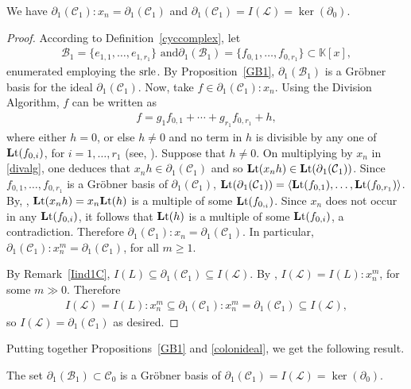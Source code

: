\documentclass[ALCO]{cedram}
\newcommand{\mbk}{\mbox{$\mathbb{K}$}}
\newcommand{\lt}{\mbox{${\bf L}{\rm t}$}}
\newcommand{\mcb}{\mbox{$\mathcal{B}$}}
\newcommand{\mcc}{\mbox{$\mathcal{C}$}}
\newcommand{\mcl}{\mbox{$\mathcal{L}$}}
\newcommand{\dif}{\mbox{$\partial$}}
\newcommand{\srle}{\mbox{${\rm srle}$}}
\begin{document}
\begin{proposition}\label{colonideal}
We have $\dif_1(\mcc_1):x_n=\dif_1(\mcc_1)$ and
$\dif_1(\mcc_1)=I(\mcl)=\ker(\dif_0)$.
\end{proposition}
\begin{proof}
According to Definition~\ref{cyccomplex}, let 
\begin{eqnarray*}
\mcb_1=\{e_{1,1},\ldots ,e_{1,r_1}\}\mbox{ and
}\dif_1(\mcb_1)=\{f_{0,1},\ldots ,f_{0,r_1}\}\subset \mbk[x],
\end{eqnarray*}
enumerated employing the $\srle$.  By
Proposition~\ref{GB1}, $\dif_1(\mcb_1)$ is a Gr\"obner basis for the
ideal $\dif_1(\mcc_1)$. Now, take $f\in \dif_1(\mcc_1):x_n$. Using the
Division Algorithm, $f$ can be written as
\begin{eqnarray}\label{divalg}
f=g_1f_{0,1}+\cdots +g_{r_1}f_{0,r_1}+h, 
\end{eqnarray}
where either $h=0$, or else $h\neq 0$ and no term in $h$ is divisible
by any one of $\lt(f_{0,i})$, for $i=1,\ldots ,r_1$ (see, \eg
\cite[\S~2.3, Theorem~3]{clo}). Suppose that $h\neq 0$. On multiplying
by $x_n$ in \eqref{divalg}, one deduces that $x_nh\in \dif_1(\mcc_1)$
and so $\lt(x_nh)\in \lt(\dif_1(\mcc_1))$. Since $f_{0,1},\ldots
,f_{0,r_1}$ is a Gr\"obner basis of $\dif_1(\mcc_1)$,
$\lt(\dif_1(\mcc_1))=\langle \lt(f_{0,1}),\ldots
,\lt(f_{0,r_1})\rangle$. By, \eg \cite[\S~2.4, Lemma~2]{clo},
$\lt(x_nh)=x_n\lt(h)$ is a multiple of some $\lt(f_{0,_i})$.  Since
$x_n$ does not occur in any $\lt(f_{0,i})$, it follows that $\lt(h)$
is a multiple of some $\lt(f_{0,i})$, a contradiction. Therefore
$\dif_1(\mcc_1):x_n=\dif_1(\mcc_1)$. In particular,
$\dif_1(\mcc_1):x_n^{m}=\dif_1(\mcc_1)$, for all $m\geq 1$.

By Remark~\ref{Iind1C}, $I(L)\subseteq \dif_1(\mcc_1)\subseteq
I(\mcl)$.  By \cite[Proposition~5.7]{opv}, $I(\mcl)=I(L):x_n^m$, for
some $m\gg 0$. Therefore
\begin{eqnarray*}
I(\mcl)=I(L):x_n^m\subseteq
\dif_1(\mcc_1):x_n^m=\dif_1(\mcc_1)\subseteq I(\mcl),
\end{eqnarray*}
so $I(\mcl)=\dif_1(\mcc_1)$ as desired.
\end{proof}

Putting together Propositions~\ref{GB1} and \ref{colonideal}, we get
the following result.

\begin{corollary}\label{GBI(L)}
The set $\dif_1(\mcb_1)\subset\mcc_0$ is a Gr\"obner basis of
$\dif_1(\mcc_1)=I(\mcl)=\ker(\dif_0)$.
\end{corollary}
\end{document}
